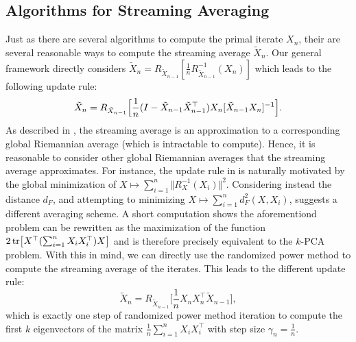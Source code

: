 \subsection{Algorithms for Streaming Averaging}
Just as there are several algorithms to compute the primal iterate $X_n$, their are several reasonable ways to compute the streaming average $\tilde X_n$. Our general framework directly considers $\tilde X_n=R_{\tilde X_{n-1}}[\frac{1}{n}R^{-1}_{\tilde X_{n-1}}(X_n)]$ which leads to the following update rule:
\begin{equation}\label{eq:averageojaret}
\tilde X_n=R_{\tilde X_{n-1}}\Big[\frac{1}{n}(I -\tilde X_{n-1}\tilde X_{n-1}^\top)X_n[\tilde X_{n-1}X_n]^{-1}\Big].
\end{equation}
As described in , the streaming average is an approximation to a corresponding global Riemannian average (which is intractable to compute). Hence, it is reasonable to consider
other global Riemannian averages that the streaming average approximates. For instance, the update rule in  is naturally motivated by the global minimization of $X\mapsto\sum_{i=1}^n\Vert R^{-1}_X(X_i)\Vert^2$. Considering instead the distance $d_F$, and attempting to minimizing $X\mapsto\sum_{i=1}^n d^2_F(X,X_i)$, suggests a different averaging scheme. A short computation shows the aforementiond problem can be rewritten as the maximization of the function $2\tr [X^\top(\sum_{i=1}^n X_iX_i^\top)X]$ and is therefore precisely equivalent to the $k$-PCA problem.
With this in mind, we can directly use the randomized power method to compute the streaming average of the iterates. This leads to the different update rule:
\begin{equation}\label{eq:averageoja}
\tilde X_n=R_{\tilde X_{n-1}}\Big[\frac{1}{n}X_nX_n^\top \tilde X_{n-1}\Big],
\end{equation}
which is exactly one step of randomized power method iteration to compute the first $k$ eigenvectors of the matrix $\frac{1}{n}\sum_{i=1}^nX_iX_i^\top$ with step size $\gamma_n=\frac{1}{n}$.

